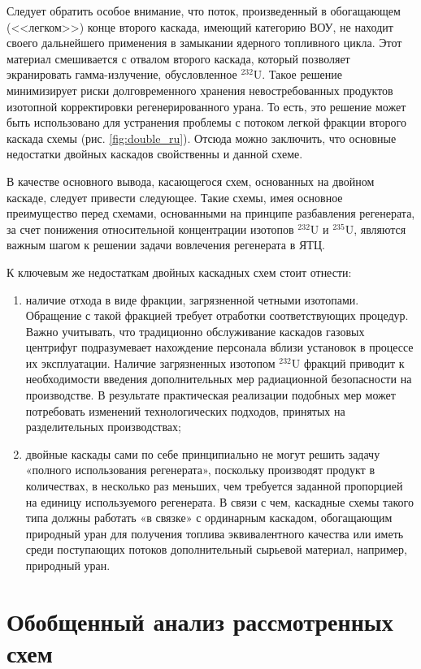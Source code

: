 Следует обратить особое внимание, что поток, произведенный в обогащающем (<<легком>>) конце второго каскада, имеющий категорию ВОУ, не находит своего дальнейшего применения в замыкании ядерного топливного цикла. Этот материал смешивается с отвалом второго каскада, который позволяет экранировать гамма-излучение, обусловленное $^{232}$U. Такое решение минимизирует риски долговременного хранения невостребованных продуктов изотопной корректировки регенерированного урана. То есть, это решение может быть использовано для устранения проблемы с потоком легкой фракции второго каскада схемы (рис. \ref{fig:double_ru}). Отсюда можно заключить, что основные недостатки двойных каскадов свойственны и данной схеме. 

В качестве основного вывода, касающегося схем, основанных на двойном каскаде, следует привести следующее. Такие схемы, имея основное преимущество перед схемами, основанными на принципе разбавления регенерата, за счет понижения относительной концентрации изотопов  $^{232}$U и  $^{235}$U, являются важным шагом к решении задачи вовлечения регенерата в ЯТЦ. 

К ключевым же недостаткам двойных каскадных схем стоит отнести: 
\begin{enumerate}
  \item наличие отхода в виде фракции, загрязненной четными изотопами. Обращение с такой фракцией требует отработки соответствующих процедур. Важно учитывать, что традиционно обслуживание каскадов газовых центрифуг подразумевает нахождение персонала вблизи установок в процессе их эксплуатации. Наличие загрязненных изотопом $^{232}$U фракций приводит к необходимости введения дополнительных мер радиационной безопасности на производстве. В результате практическая реализации подобных мер может потребовать изменений технологических подходов, принятых на разделительных производствах;
  \item двойные каскады сами по себе принципиально не могут решить задачу «полного использования регенерата», поскольку производят продукт в количествах, в несколько раз меньших, чем требуется заданной пропорцией на единицу используемого регенерата. В связи с чем, каскадные схемы такого типа должны работать «в связке» с ординарным каскадом, обогащающим природный уран для получения топлива эквивалентного качества или иметь среди поступающих потоков дополнительный сырьевой материал, например, природный уран.
\end{enumerate}


\section{Обобщенный анализ рассмотренных схем}

